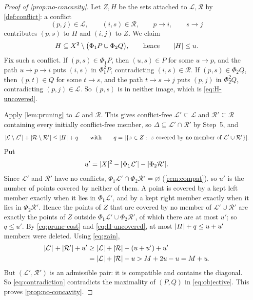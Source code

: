 \begin{proof}[Proof of \cref{prop:no-concavity}]
Let $Z,H$ be the sets attached to $\mathcal L,\mathcal R$ by \cref{def:conflict}: a conflict
\[
 (p,j)\in\mathcal L,\qquad (i,s)\in\mathcal R,\qquad p\to i,\qquad s\to j
\]
contributes $(p,s)$ to $H$ and $(i,j)$ to $Z$. We claim
\begin{equation}\label{eq:H-uncovered}
 H\subseteq X^2\setminus\bigl(\Phi_1P\cup\Phi_2Q\bigr),
 \qquad\text{hence}\qquad \lvert H\rvert\le u .
\end{equation}
Fix such a conflict. If $(p,s)\in\Phi_1P$, then $(u,s)\in P$ for some $u\to p$, and the path
$u\to p\to i$ puts $(i,s)$ in $\Phi_1^2P$, contradicting $(i,s)\in\mathcal R$. If
$(p,s)\in\Phi_2Q$, then $(p,t)\in Q$ for some $t\to s$, and the path $t\to s\to j$ puts $(p,j)$ in
$\Phi_2^2Q$, contradicting $(p,j)\in\mathcal L$. So $(p,s)$ is in neither image, which is
\eqref{eq:H-uncovered}.

Apply \cref{lem:pruning} to $\mathcal L$ and $\mathcal R$. This gives conflict-free
$\mathcal L'\subseteq\mathcal L$ and $\mathcal R'\subseteq\mathcal R$ containing every initially
conflict-free member, so $\Delta\subseteq\mathcal L'\cap\mathcal R'$ by Step~5, and
\begin{equation}\label{eq:prune-cost}
 \lvert \mathcal L\setminus\mathcal L'\rvert+\lvert \mathcal R\setminus\mathcal R'\rvert\le\lvert H\rvert+q
 \qquad\text{with}\qquad
 q=\lvert \{z\in Z:\ z\text{ covered by no member of }\mathcal L'\cup\mathcal R'\}\rvert .
\end{equation}
Put
\begin{equation}\label{eq:u-prime}
 u'=\lvert X\rvert^2-\lvert \Phi_1\mathcal L'\rvert-\lvert \Phi_2\mathcal R'\rvert .
\end{equation}
Since $\mathcal L'$ and $\mathcal R'$ have no conflicts, $\Phi_1\mathcal L'\cap\Phi_2\mathcal R'=\varnothing$
(\cref{rem:compat}), so $u'$ is the number of points covered by neither of them. A point is covered
by a kept left member exactly when it lies in $\Phi_1\mathcal L'$, and by a kept right member exactly
when it lies in $\Phi_2\mathcal R'$. Hence the points of $Z$ that are covered by no member of
$\mathcal L'\cup\mathcal R'$ are exactly the points of $Z$ outside $\Phi_1\mathcal L'\cup\Phi_2\mathcal R'$,
of which there are at most $u'$; so $q\le u'$. By \eqref{eq:prune-cost} and \eqref{eq:H-uncovered},
at most $\lvert H\rvert+q\le u+u'$ members were deleted. Using \eqref{eq:gain},
\begin{align}
 \lvert \mathcal L'\rvert+\lvert \mathcal R'\rvert+u'
 &\ge\lvert \mathcal L\rvert+\lvert \mathcal R\rvert-(u+u')+u'\notag\\
 &=\lvert \mathcal L\rvert+\lvert \mathcal R\rvert-u>M+2u-u=M+u .
 \label{eq:contradiction}
\end{align}
But $(\mathcal L',\mathcal R')$ is an admissible pair: it is compatible and contains the diagonal. So
\eqref{eq:contradiction} contradicts the maximality of $(P,Q)$ in \eqref{eq:objective}. This proves
\cref{prop:no-concavity}.
\end{proof}

